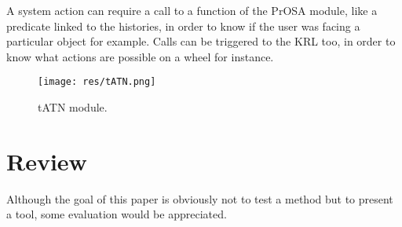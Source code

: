 \documentclass[a4paper]{article}
\begin{document}
A system action can require a call to a function of the PrOSA module, like a predicate linked to the histories, in order to know if the user was facing a particular object for example. Calls can be triggered to the KRL too, in order to know what actions are possible on a wheel for instance.

\begin{figure}
\centering
\texttt{[image: res/tATN.png]}
\caption{\label{fig:tATN}tATN module.}
\end{figure}

\section{Review}

Although the goal of this paper is obviously not to test a method but to present a tool, some evaluation would be appreciated.
\end{document}
